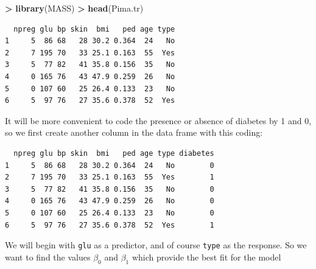 \documentclass[
]{krantz}
\makeatletter
\newenvironment{Shaded}{\begin{snugshade}}{\end{snugshade}}
\newcommand{\DecValTok}[1]{\textcolor[rgb]{0.06,0.06,0.06}{#1}}
\newcommand{\KeywordTok}[1]{\textcolor[rgb]{0.27,0.27,0.27}{\textbf{#1}}}
\newcommand{\NormalTok}[1]{#1}
\newcommand{\OperatorTok}[1]{\textcolor[rgb]{0.43,0.43,0.43}{\textbf{#1}}}
\newcommand{\StringTok}[1]{\textcolor[rgb]{0.5,0.5,0.5}{#1}}
\newenvironment{kframe}{%
\medskip{}
\setlength{\fboxsep}{.8em}
 \def\at@end@of@kframe{}%
 \ifinner\ifhmode%
  \def\at@end@of@kframe{\end{minipage}}%
  \begin{minipage}{\columnwidth}%
 \fi\fi%
 \def\FrameCommand##1{\hskip\@totalleftmargin \hskip-\fboxsep
 \colorbox{shadecolor}{##1}\hskip-\fboxsep
     \hskip-\linewidth \hskip-\@totalleftmargin \hskip\columnwidth}%
 \MakeFramed {\advance\hsize-\width
   \@totalleftmargin\z@ \linewidth\hsize
   \@setminipage}}%
 {\par\unskip\endMakeFramed%
 \at@end@of@kframe}
\renewenvironment{Shaded}{\begin{kframe}}{\end{kframe}}
\makeatother
\begin{document}
\begin{Shaded}
\begin{Highlighting}[]
\OperatorTok{\textgreater{}}\StringTok{ }\KeywordTok{library}\NormalTok{(MASS)}
\OperatorTok{\textgreater{}}\StringTok{ }\KeywordTok{head}\NormalTok{(Pima.tr)}
\end{Highlighting}
\end{Shaded}

\begin{verbatim}
  npreg glu bp skin  bmi   ped age type
1     5  86 68   28 30.2 0.364  24   No
2     7 195 70   33 25.1 0.163  55  Yes
3     5  77 82   41 35.8 0.156  35   No
4     0 165 76   43 47.9 0.259  26   No
5     0 107 60   25 26.4 0.133  23   No
6     5  97 76   27 35.6 0.378  52  Yes
\end{verbatim}

It will be more convenient to code the presence or absence of diabetes by 1 and 0, so we first create another column in the data frame with this coding:

\begin{Shaded}
\end{Shaded}

\begin{verbatim}
  npreg glu bp skin  bmi   ped age type diabetes
1     5  86 68   28 30.2 0.364  24   No        0
2     7 195 70   33 25.1 0.163  55  Yes        1
3     5  77 82   41 35.8 0.156  35   No        0
4     0 165 76   43 47.9 0.259  26   No        0
5     0 107 60   25 26.4 0.133  23   No        0
6     5  97 76   27 35.6 0.378  52  Yes        1
\end{verbatim}

We will begin with \texttt{glu} as a predictor, and of course \texttt{type} as the response. So we want to find the values \(\beta_0\) and \(\beta_1\) which provide the best fit for the model
\end{document}
